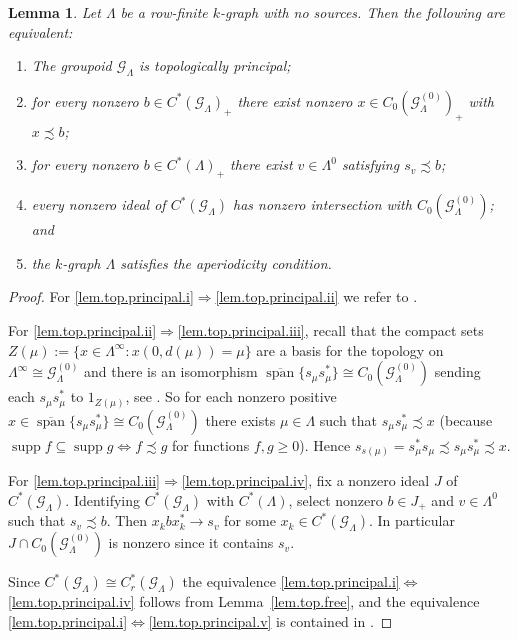 \documentclass[a4paper, 12pt]{amsart}
\numberwithin{equation}{section}
\newcounter{theorem}
\newtheorem{lemma}[theorem]{Lemma}
\theoremstyle{remark}
\theoremstyle{definition}
\begin{document}
\begin{lemma}\label{lem.top.principal}
Let $\Lambda$ be a row-finite $k$-graph with no sources. Then the following are equivalent:
\begin{enumerate}
\item\label{lem.top.principal.i} The groupoid ${\mathcal{G}}_\Lambda$ is topologically principal;
\item\label{lem.top.principal.ii} for every nonzero $b\in C^*({\mathcal{G}}_\Lambda)_+$  there exist nonzero $x\in
    C_0({\mathcal{G}}^{(0)}_\Lambda)_+$ with $x\precsim  b$;
\item\label{lem.top.principal.iii} for every nonzero $b\in C^*(\Lambda)_+$ there exist $v\in \Lambda^0$
    satisfying $s_v\precsim  b$;
\item\label{lem.top.principal.iv} every nonzero ideal of  $C^*({\mathcal{G}}_\Lambda)$ has nonzero intersection with
    $C_0({\mathcal{G}}^{(0)}_\Lambda)$; and
\item\label{lem.top.principal.v} the $k$-graph $\Lambda$ satisfies the aperiodicity condition.
\end{enumerate}
\end{lemma}
\begin{proof}
For \eqref{lem.top.principal.i}$\Rightarrow$\eqref{lem.top.principal.ii} we refer to \cite[Lemmas~3.1 and 3.2]{BroClaSie}.

For \eqref{lem.top.principal.ii}$\Rightarrow$\eqref{lem.top.principal.iii}, recall that the compact sets $Z(\mu):=\{x\in \Lambda^\infty:
x(0,d(\mu))=\mu\}$ are a basis for the topology on $\Lambda^{\infty}\cong
{\mathcal{G}}^{(0)}_\Lambda$ and there is an isomorphism ${\overline{\operatorname{span}}}\{s_\mu s_\mu^*\} \cong
C_0({\mathcal{G}}^{(0)}_\Lambda)$ sending each $s_\mu s_\mu^*$ to $1_{Z(\mu)}$, see \cite{MR1745529}. So
for each nonzero positive $x\in {\overline{\operatorname{span}}}\{s_\mu s_\mu^*\} \cong C_0({\mathcal{G}}^{(0)}_\Lambda)$
there exists $\mu\in\Lambda$ such that $s_\mu s_\mu^*\precsim x$ (because ${\operatorname{supp}} f
\subseteq {\operatorname{supp}} g\Leftrightarrow f \precsim g$ for functions $f,g\geq 0$).
Hence $s_{s(\mu)}=s_\mu^* s_\mu\precsim s_\mu s_\mu^*\precsim x$.

For \eqref{lem.top.principal.iii}$\Rightarrow$\eqref{lem.top.principal.iv}, fix a nonzero ideal $J$ of $C^*({\mathcal{G}}_\Lambda)$. Identifying
$C^*({\mathcal{G}}_\Lambda)$ with $C^*(\Lambda)$, select nonzero $b\in J_+$ and $v\in \Lambda^0$
such that $s_v\precsim  b$. Then $x_kbx_k^*\to s_v$ for some $x_k\in C^*({\mathcal{G}}_\Lambda)$.
In particular $J\cap C_0({\mathcal{G}}^{(0)}_\Lambda)$ is nonzero since it contains $s_v$.

Since $C^*({\mathcal{G}}_\Lambda)\cong C^*_r({\mathcal{G}}_\Lambda)$ the equivalence \eqref{lem.top.principal.i}$\Leftrightarrow$\eqref{lem.top.principal.iv}
follows from Lemma~\ref{lem.top.free}, and the equivalence \eqref{lem.top.principal.i}$\Leftrightarrow$\eqref{lem.top.principal.v} is
contained in \cite[Proposition~4.5]{MR1745529}.
\end{proof}
\end{document}
